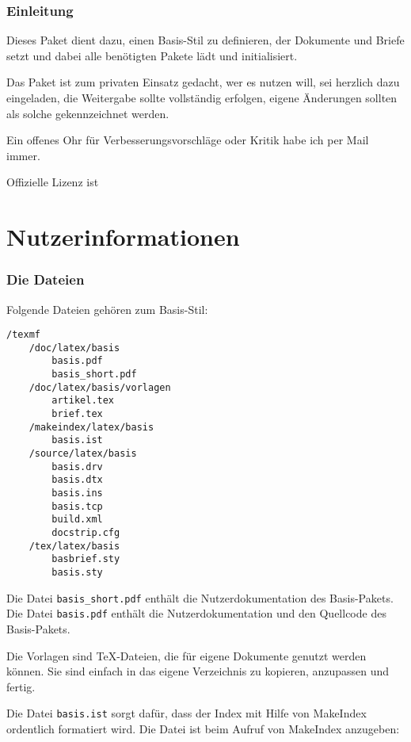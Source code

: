 
\section{Einleitung}

Dieses Paket dient dazu, einen Basis-Stil zu definieren, der Dokumente und Briefe setzt und dabei alle benötigten Pakete lädt und initialisiert.

Das Paket ist zum privaten Einsatz gedacht, wer es nutzen will, sei herzlich dazu eingeladen, die Weitergabe sollte vollständig erfolgen, eigene Änderungen sollten als solche gekennzeichnet werden.

Ein offenes Ohr für Verbesserungsvorschläge oder Kritik habe ich per Mail immer.

Offizielle Lizenz ist


\cleardoublepage
\part{Nutzerinformationen}
\cleardoublepage


\section{Die Dateien}
\label{sec:Dateien}

Folgende Dateien gehören zum Basis-Stil:
{\small
\begin{verbatim}
/texmf
	/doc/latex/basis
		basis.pdf
		basis_short.pdf
	/doc/latex/basis/vorlagen
		artikel.tex
		brief.tex
	/makeindex/latex/basis
		basis.ist
	/source/latex/basis
		basis.drv
		basis.dtx
		basis.ins
		basis.tcp
		build.xml
		docstrip.cfg
	/tex/latex/basis
		basbrief.sty
		basis.sty
\end{verbatim}
}


Die Datei \verb#basis_short.pdf# enthält die Nutzerdokumentation des Basis-Pakets.
Die Datei \verb#basis.pdf# enthält die Nutzerdokumentation und den Quellcode des Basis-Pakets.


Die Vorlagen sind \TeX-Dateien, die für eigene Dokumente genutzt werden können.
Sie sind einfach in das eigene Verzeichnis zu kopieren, anzupassen und fertig.


Die Datei \verb#basis.ist# sorgt dafür, dass der Index mit Hilfe von MakeIndex
ordentlich formatiert wird.
Die Datei ist beim Aufruf von MakeIndex anzugeben:

